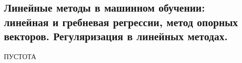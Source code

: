 \subsection{Линейные методы в машинном обучении: линейная и гребневая регрессии, метод опорных векторов. Регуляризация в линейных методах.}

ПУСТОТА